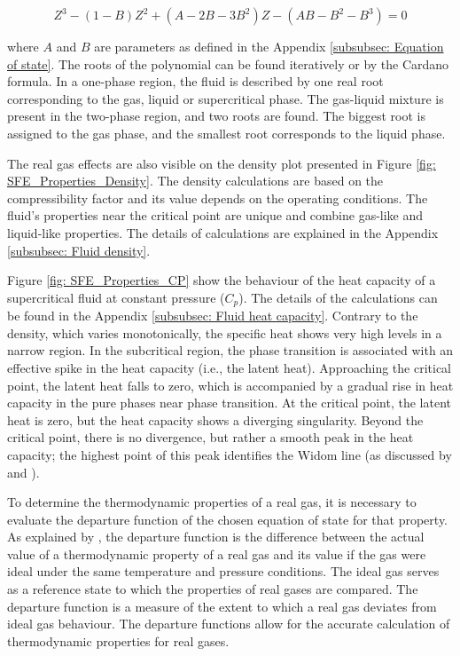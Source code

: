 \documentclass[../Article_Model_Parameters.tex]{subfiles}
\begin{document}
	{\footnotesize
		\begin{equation}
			Z^3 - (1-B)Z^2+(A-2B-3B^2)Z -(AB-B^2-B^3) = 0
			\label{EQ: PR_polynomial}
		\end{equation}
	}
	
	where $A$ and $B$ are parameters as defined in the Appendix \ref{subsubsec: Equation of state}. The roots of the polynomial can be found iteratively or by the Cardano formula. In a one-phase region, the fluid is described by one real root corresponding to the gas, liquid or supercritical phase. The gas-liquid mixture is present in the two-phase region, and two roots are found. The biggest root is assigned to the gas phase, and the smallest root corresponds to the liquid phase.
	
	The real gas effects are also visible on the density plot presented in Figure \ref{fig: SFE_Properties_Density}. The density calculations are based on the compressibility factor and its value depends on the operating conditions. The fluid's properties near the critical point are unique and combine gas-like and liquid-like properties. The details of calculations are explained in the Appendix \ref{subsubsec: Fluid density}.
	
	Figure \ref{fig: SFE_Properties_CP} show the behaviour of the heat capacity of a supercritical fluid at constant pressure ($C_p$). The details of the calculations can be found in the Appendix \ref{subsubsec: Fluid heat capacity}. Contrary to the density, which varies monotonically, the specific heat shows very high levels in a narrow region. In the subcritical region, the phase transition is associated with an effective spike in the heat capacity (i.e., the latent heat). Approaching the critical point, the latent heat falls to zero, which is accompanied by a gradual rise in heat capacity in the pure phases near phase transition. At the critical point, the latent heat is zero, but the heat capacity shows a diverging singularity. Beyond the critical point, there is no divergence, but rather a smooth peak in the heat capacity; the highest point of this peak identifies the Widom line (as discussed by \citet{Simeoni2010} and \citet{Banuti2019}).
	
	To determine the thermodynamic properties of a real gas, it is necessary to evaluate the departure function of the chosen equation of state for that property. As explained by \citet{Elliott2011}, the departure function is the difference between the actual value of a thermodynamic property of a real gas and its value if the gas were ideal under the same temperature and pressure conditions. The ideal gas serves as a reference state to which the properties of real gases are compared. The departure function is a measure of the extent to which a real gas deviates from ideal gas behaviour. The departure functions allow for the accurate calculation of thermodynamic properties for real gases.  %
	
\end{document}
